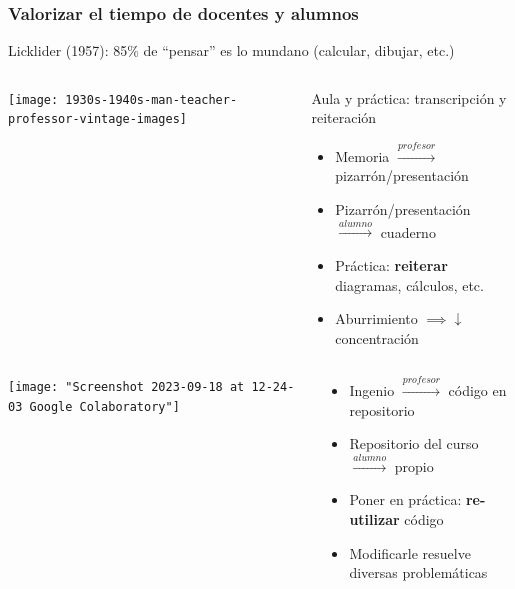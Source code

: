 \documentclass[aspectratio=169]{beamer}
\begin{document}
\begin{frame}
	\frametitle{Valorizar el tiempo de docentes y alumnos}
	Licklider (1957): 85\% de ``pensar'' es lo mundano (calcular, dibujar, etc.)
	\pause
	\begin{block}{}
	  \begin{columns}[b]
			\begin{column}{0.3\textwidth}
				\texttt{[image: 1930s-1940s-man-teacher-professor-vintage-images]}
			\end{column}
			\begin{column}{0.65\textwidth}
				Aula y práctica: transcripción y reiteración
				\begin{itemize}[<+->]
					\item Memoria \(\xrightarrow{profesor}\) pizarrón/presentación
					\item Pizarrón/presentación \(\xrightarrow{alumno}\) cuaderno
					\item Práctica: \textbf{reiterar} diagramas, cálculos, etc.
					\item Aburrimiento \(\implies \downarrow\) concentración
				\end{itemize}
			\end{column}
		\end{columns}
	\end{block}
	\pause
	\begin{block}{}
	  \begin{columns}[b]
			\begin{column}{0.3\textwidth}
				\texttt{[image: "Screenshot 2023-09-18 at 12-24-03 Google Colaboratory"]}
			\end{column}
			\begin{column}{0.65\textwidth}
				\begin{itemize}[<+->]
					\item Ingenio \(\xrightarrow{profesor}\) código en repositorio
					\item Repositorio del curso \(\xrightarrow{alumno}\) propio
					\item Poner en práctica: \textbf{re-utilizar} código
					\item Modificarle resuelve diversas problemáticas
				\end{itemize}
			\end{column}
		\end{columns}
	\end{block}
\end{frame}
\end{document}
